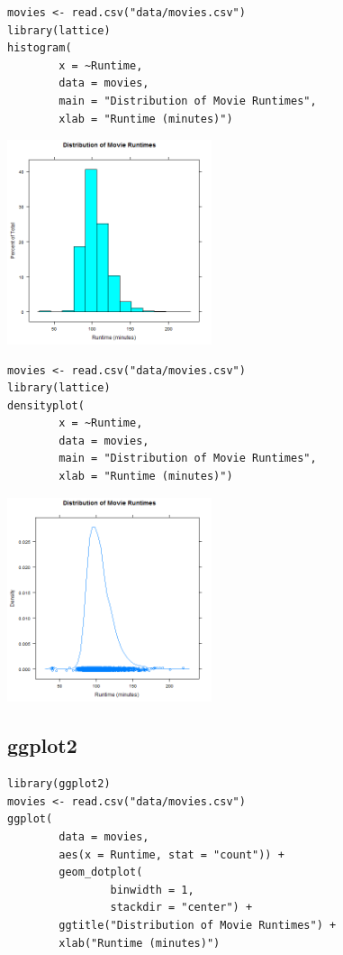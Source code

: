 \documentclass[a4paper, captions=tableheading]{tufte-book}
\begin{document}
\begin{verbatim}
movies <- read.csv("data/movies.csv")
library(lattice)
histogram(
		x = ~Runtime,
		data = movies,
		main = "Distribution of Movie Runtimes",
		xlab = "Runtime (minutes)")
\end{verbatim}

\includegraphics[height=6cm]{img/1-num-lattice-03.png}

\begin{verbatim}
movies <- read.csv("data/movies.csv")
library(lattice)
densityplot(
		x = ~Runtime,
		data = movies,
		main = "Distribution of Movie Runtimes",
		xlab = "Runtime (minutes)")
\end{verbatim}

\includegraphics[height=6cm]{img/1-num-lattice-04.png}

\subsection{ggplot2}
\label{sec:orgheadline9}

\begin{verbatim}
library(ggplot2)
movies <- read.csv("data/movies.csv")
ggplot(
		data = movies,
		aes(x = Runtime, stat = "count")) +
		geom_dotplot(
				binwidth = 1,
				stackdir = "center") +
		ggtitle("Distribution of Movie Runtimes") +
		xlab("Runtime (minutes)")
\end{verbatim}
\end{document}

